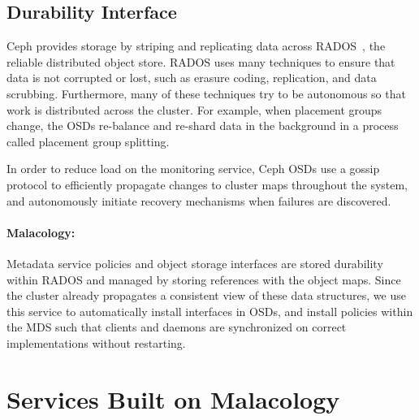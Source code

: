 \documentclass[preprint]{sigplanconf-eurosys}
\begin{document}
\subsection{Durability Interface}
\label{sec:durability}

Ceph provides storage by striping and replicating data across
RADOS~\cite{weil_rados_2007}, the reliable distributed object store. RADOS
uses many techniques to ensure that data is not corrupted or lost, such as
erasure coding, replication, and data scrubbing. Furthermore, many of these
techniques try to be autonomous so that work is distributed across the
cluster. For example, when placement groups change, the OSDs re-balance and
re-shard data in the background in a process called placement group splitting.

In order to reduce load on the monitoring service, Ceph OSDs use a gossip
protocol to efficiently propagate changes to cluster maps throughout the
system, and autonomously initiate recovery mechanisms when failures are
discovered.

\paragraph*{Malacology:} Metadata service policies and object storage
interfaces are stored durability within RADOS and managed by storing references
with the object maps. Since the cluster already propagates a consistent view of
these data structures, we use this service to automatically install interfaces
in OSDs, and install policies within the MDS such that clients and daemons are
synchronized on correct implementations without restarting.

\section{Services Built on Malacology}
\label{sec:services}
\label{services-built-on-malacology}
\end{document}
